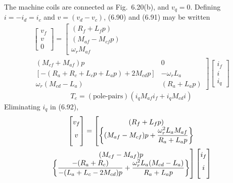 \documentclass[a4paper,numbers=noenddot,12pt]{scrbook}
\begin{document}
    The machine coils are connected as Fig.\ 6.20(b), and $v_q = 0$. Defining $i = -i_d = i_c$ and $v = (v_d - v_c)$, (6.90) and (6.91) may be written
    \begin{multline}
        \begin{bmatrix}
            v_f \\ v \\ 0
        \end{bmatrix}
        =
        \left[
            \begin{matrix}
                (R_f + L_f p) \\
                (M_{af} - M_{cf} p) \\
                \omega_r M_{af}
            \end{matrix}
            \right.\\
            \left.
            \begin{matrix}
                (M_{cf} + M_{af}) p & 0 \\
                [-(R_a + R_c + L_c p + L_a p) + 2 M_{cd}p] & -\omega_r L_a \\
                \omega_r(M_{cd} - L_a) & (R_a + L_a p)
            \end{matrix}
        \right]
        \begin{bmatrix}
            i_f \\i \\i_q
        \end{bmatrix}
    \end{multline}
    \begin{equation}
        T_e = (\text{pole-pairs})(i_q M_{af} i_f + i_q M_{cd} i)
        \label{eq:Eq6.93}
    \end{equation}
    Eliminating $i_q$ in (6.92),
    \begin{multline}
        \begin{bmatrix}
            v_f \\  v \vphantom{\bigg\{\dfrac{M^2}{R_a}\bigg\}} 
        \end{bmatrix}
        =
        \left[
            \begin{matrix}
                (R_f + L_f p) \\ 
                \bigg\{(M_{af} - M_{cf})p + \dfrac{\omega_r^2 L_a M_{af}}{R_a + L_a p}\bigg\}
            \end{matrix}
            \right . \\
            \left .
            \begin{matrix}
                (M_{cf} - M_{af})p \\
                \bigg\{\dfrac{-(R_a + R_c)}{-(L_a + L_c -2 M_{cd})p} + \dfrac{\omega_r^2 L_a (M_{cd} - L_a)}{R_a + L_a p}\bigg\}
            \end{matrix}
        \right]
        \begin{bmatrix}
            i_f \\ i \vphantom{\bigg\{\dfrac{M^2}{R_a}\bigg\}} 
        \end{bmatrix}
    \end{multline}
\end{document}
